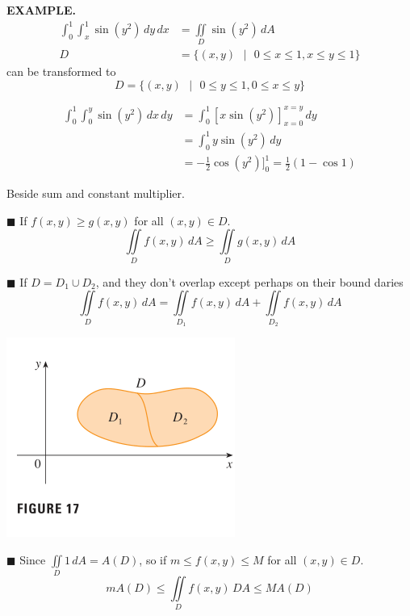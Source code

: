 \documentclass{article}
\begin{document}
\begin{minipage}[]{0.67\linewidth}
  {\selectfont \textbf{\textcolor{blue5}{ EXAMPLE.}}} 
  \begin{equation*}
    \begin{split}
      \int_0^1 \int_x^1 \sin{(y^2)}\,dy\,dx & = \iint \limits_{D} \sin{(y^2)} \, dA  \\ D & = \big\{ (x,y) \text{ } | \text{ } 0 \le x \le 1, x \le y \le 1 \big\}
\end{split}   
  \end{equation*}
 can be transformed to 
 \[D = \big\{ (x,y) \text{ } | \text{ } 0 \le y \le 1, 0 \le x \le y \big\}\]
 
\begin{equation*}
  \begin{split}
    \int_0^1 \int_0^y \sin{(y^2)} \,dx \,dy &  = \int_0^1 \left[ x\sin{(y^2)} \right]  _{x=0}^{x = y} \, dy \\ 
                                            & = \int_0^1 y \sin{(y^2)} \, dy \\ 
                                            & = - \frac{1 }{2 } \cos{(y^2)} \big]_0^1 = \frac{1 }{2 } ( 1 - \cos{1  })
  \end{split}
\end{equation*}
\end{minipage}

\begin{properties}
  Beside sum and constant multiplier.

  \textcolor{blue5}{$\blacksquare$} If $f(x,y) \ge g(x,y)$ for all $(x,y) \in D $.
  \[\iint \limits_{D } f(x,y) \,dA \ge \iint \limits_{D } g(x,y) \, dA  \]

  
  \begin{minipage}[]{0.6 \linewidth}
  \textcolor{blue5}{$\blacksquare$} If $D = D_1 \cup D_2 $, and they don't overlap except perhaps on their bound daries 
  \[\iint \limits_{D}  f(x,y ) \, dA = \iint \limits_{D_1 } f(x,y) \, dA + \iint \limits_{D_2 }  f(x,y) \, dA \]
    
  \end{minipage}
  \begin{minipage}[]{0.3\linewidth}
    \begin{center}
      \includegraphics[width = 4.3  cm]{images/2domain.png} 
    \end{center}
  \end{minipage}
 
  \textcolor{blue5}{$\blacksquare$} Since $\iint \limits_{D }  1 \, dA = A(D )$, so if $m \le f(x,y) \le M $ for all $(x,y) \in D $.
  \[mA(D) \le \iint \limits_{D }  f(x,y ) \, DA \le MA(D )\]
\end{properties}
\end{document}
